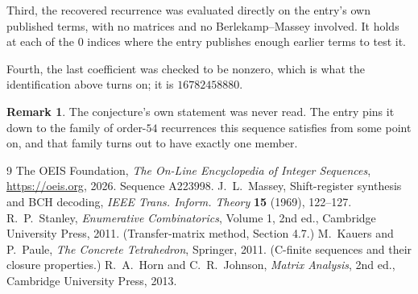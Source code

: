 \documentclass[11pt,a4paper]{article}
\theoremstyle{plain}
\theoremstyle{definition}
\newtheorem{remark}[theorem]{Remark}
\begin{document}
Third, the recovered recurrence was evaluated directly on the entry's own published terms, with
no matrices and no Berlekamp--Massey involved. It holds at each of the $0$ indices where
the entry publishes enough earlier terms to test it.

Fourth, the last coefficient was checked to be nonzero, which is what the identification above
turns on; it is $16782458880$.

\begin{remark}
The conjecture's own statement was never read. The entry pins it down to the family of
order-$54$ recurrences this sequence satisfies from some point on, and that family turns
out to have exactly one member.
\end{remark}

\begin{thebibliography}{9}
 The OEIS Foundation, \emph{The On-Line Encyclopedia of Integer
Sequences}, \url{https://oeis.org}, 2026. Sequence A223998.
 J.~L.~Massey, Shift-register synthesis and BCH decoding, \emph{IEEE
Trans. Inform. Theory} \textbf{15} (1969), 122--127.
 R.~P.~Stanley, \emph{Enumerative Combinatorics}, Volume 1, 2nd ed.,
Cambridge University Press, 2011. (Transfer-matrix method, Section 4.7.)
 M.~Kauers and P.~Paule, \emph{The Concrete Tetrahedron}, Springer, 2011.
(C-finite sequences and their closure properties.)
 R.~A.~Horn and C.~R.~Johnson, \emph{Matrix Analysis}, 2nd ed., Cambridge
University Press, 2013.
\end{thebibliography}
\end{document}
